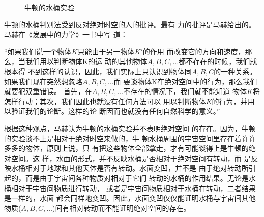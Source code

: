 \begin{figure}[h]
  \vspace{-0.8em}
  \centering
  \qquad\qquad\qquad
  \caption{牛顿的水桶实验}
  \label{fig:12.11}
\end{figure}

牛顿的水桶判别法受到反对绝对时空的人的批评。最有
力的批评是马赫给出的。马赫在《发展中的力学》一书中写
道：
\begin{quoting}
  “如果我们说一个物体$ K $只能由于另一物体$ K' $的作用
  而改变它的方向和速度，那么，当我们用以判断物体K的运
  动的其他物体$ A,B,C,\dots $都不存在的时候，我们就根本得
  不到这样的认识，因此，我们实际上只认识到物体同$ A,B,
    C $的一种关系。如果我们现在突然想忽略$ A,B,C,\dots $而
  要谈物体K在绝对空间中的行为，那么我们就要犯双重错误。
  首先，在$ A,B,C,\dots $不存在的情况下，我们就不能知道
  物体$ K $将怎样行动；其次，我们因此也就没有任何方法可以
  用以判断物体$ K $的行为，并用以验证我们的论断。这样的论
  断因而也就没有任何自然科学的意义。”
\end{quoting}

根据这种观点，马赫认为牛顿的水桶实验并不表明绝对空间
的存在。因为，牛顿的实验谈不上是相对于绝对时空来做的，牛
顿水桶周围的宇宙空间里存在着许许多多的物体，原则上说，只
有把这些物体全部拿走，才有可能谈得上是牛顿的绝对空间。这
样，水面的形式，并不反映水桶是否相对于绝对空间有转动，而
是反映水桶相对于地球和其他天体是否有转动。水面变凹，并不是
由于绝对转动所引起的，而是由于宇宙间各种物质对相对于它们
转动的水桶的作用结果。无论是水桶相对于宇宙间物质进行转动，
或者是宇宙间物质相对于水桶在转动，二者结果是一样的，水面
都会同样地变凹。因此，水面变凹仅仅能证明水桶与宇宙间其他
物质($ A,B,C,\dots $)间有相对转动而不能证明绝对空间的存在。

